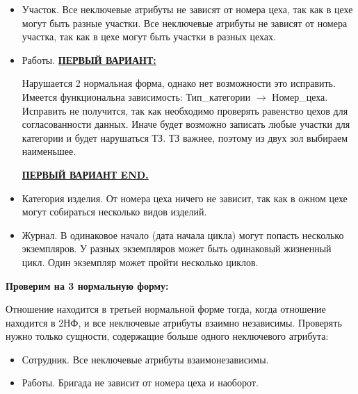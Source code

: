 \begin{itemize}

    \item Участок.
    Все неключевые атрибуты не зависят от номера цеха, так как в цехе могут быть разные участки.
    Все неключевые атрибуты не зависят от номера участка, так как в цехе могут быть участки в разных цехах.

    \item Работы.
    {\bf \underline{ПЕРВЫЙ ВАРИАНТ:}}

    Нарушается 2 нормальная форма, однако нет возможности это исправить.
    Имеется функциональна зависимость: Тип\_категории $\rightarrow$ Номер\_цеха.
    Исправить не получится, так как необходимо проверять равенство цехов для согласованности данных.
    Иначе будет возможно записать любые участки для категории и будет нарушаться ТЗ.
    ТЗ важнее, поэтому из двух зол выбираем наименьшее.

    {\bf \underline{ПЕРВЫЙ ВАРИАНТ END.}}

    \item Категория изделия.
    От номера цеха ничего не зависит, так как в ожном цехе могут собираться несколько видов изделий.

    \item Журнал.
    В одинаковое начало (дата начала цикла) могут попасть несколько экземпляров.
    У разных экземпляров может быть одинаковый жизненный цикл.
    Один экземпляр может пройти несколько циклов.


\end{itemize}


{\bf Проверим на 3 нормальную форму:}

Отношение находится в третьей нормальной форме тогда, когда отношение находится в 2НФ, и все неключевые атрибуты взаимно независимы.
Проверять нужно только сущности, содержащие больше одного неключевого атрибута:

\begin{itemize}

    \item Сотрудник. Все неключевые атрибуты взаимонезависимы.
    \item Работы. Бригада не зависит от номера цеха и наоборот.

\end{itemize}


